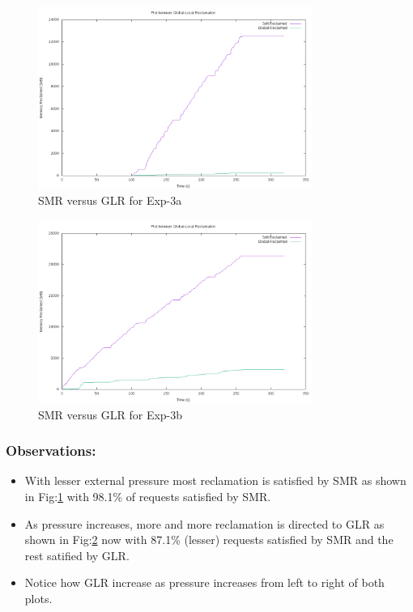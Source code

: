 	
	\begin{figure}
	  \centering
	  \includegraphics[width=0.8\textwidth]{images/experimentation/smr_glr/1/compare.png}
	  \caption{SMR versus GLR for Exp-3a}
	  \label{img_smr_glr_1_compare}
	\end{figure}
	
	\begin{figure}
	  \centering
	  \includegraphics[width=0.8\textwidth]{images/experimentation/smr_glr/2/compare.png}
	  \caption{SMR versus GLR for Exp-3b}
	  \label{img_smr_glr_2_compare}
	\end{figure}
	
	  
	\subsubsection{Observations:}
	
	  \begin{itemize}
	    \item With lesser external pressure most reclamation is satisfied by SMR as shown in Fig:\ref{img_smr_glr_1_compare} with 
98.1\% of requests satisfied by SMR.
	    \item As pressure increases, more and more reclamation is directed to GLR as shown in Fig:\ref{img_smr_glr_2_compare} now 
	    with 87.1\% (lesser) requests satisfied by SMR and the rest satified by GLR.
	    \item Notice how GLR increase as pressure increases from left to right of both plots.
	  \end{itemize}

